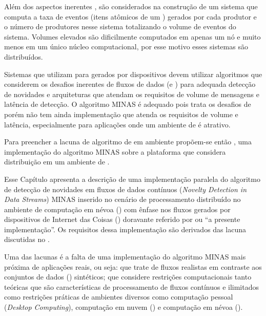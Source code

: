 Além dos aspectos inerentes \streamMining, são considerados na construção de um
sistema que computa \streams a taxa de eventos (itens atômicos de um \stream)
gerados por cada produtor e o número de produtores nesse sistema totalizando o
volume de eventos do sistema.
Volumes elevados são dificilmente computados em apenas um nó e muito menos em um
único núcleo computacional, por esse motivo esses sistemas são distribuídos.

Sistemas que utilizam \nd para \streams gerados por dispositivos \iot devem
utilizar algoritmos que considerem os desafios inerentes de fluxos de dados
(\evolution e \drift) para adequada detecção de novidades e arquiteturas
que atendam os requisitos de volume de mensagens e latência de detecção.
O algoritmo MINAS é adequado pois trata os desafios de \streamMining porém não
tem ainda implementação que atenda os requisitos de volume e latência,
especialmente para aplicações \iot onde um ambiente de \fog é atrativo.

Para preencher a lacuna de algoritmo de \nd em ambiente \fog propõem-se então
\mfog, uma implementação do algoritmo MINAS sobre a plataforma \flink que
considera distribuição em um ambiente de \fog.




Esse Capítulo apresenta a descrição de uma implementação paralela do algoritmo
de detecção de novidades em fluxos de dados contínuos (\emph{Novelty Detection
in Data Streams}) MINAS inserido no cenário de processamento distribuído no
ambiente de computação em névoa (\fog) com ênfase nos fluxos gerados por
dispositivos de Internet das Coisas (\iot) doravante referido por \mfog ou 
``a presente implementação''.
Os requisitos dessa implementação são derivados das lacuna discutidas no
.



Uma das lacunas é a falta de uma implementação do algoritmo
MINAS mais próxima de aplicações reais, ou seja:
que trate de fluxos realistas em contraste aos conjuntos de dados (\datasets)
sintéticos;
que considere restrições computacionais tanto teóricas que são características
de processamento de fluxos contínuos e ilimitados como restrições práticas
de ambientes diversos como computação pessoal (\emph{Desktop Computing}), 
computação em nuvem (\cloud) e computação em névoa (\fog).

